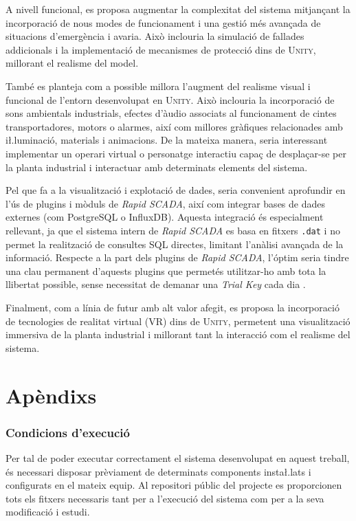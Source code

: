 \documentclass[a4paper,11pt,DIV=13,headings=normal,abstract=true,twoside=semi]{article}
\newcommand{\acro}[1]{\textsc{#1}}
\begin{document}
A nivell funcional, es proposa augmentar la complexitat del sistema mitjançant la incorporació de nous modes de funcionament i una gestió més avançada de situacions d'emergència i avaria. Això inclouria la simulació de fallades addicionals i la implementació de mecanismes de protecció dins de \acro{Unity}, millorant el realisme del model.

També es planteja com a possible millora l'augment del realisme visual i funcional de l'entorn desenvolupat en \acro{Unity}. Això inclouria la incorporació de sons ambientals industrials, efectes d'àudio associats al funcionament de cintes transportadores, motors o alarmes, així com millores gràfiques relacionades amb i\l.luminació, materials i animacions. De la mateixa manera, seria interessant implementar un operari virtual o personatge interactiu capaç de desplaçar-se per la planta industrial i interactuar amb determinats elements del sistema.

Pel que fa a la visualització i explotació de dades, seria convenient aprofundir en l'ús de plugins i mòduls de \emph{Rapid SCADA}, així com integrar bases de dades externes (com PostgreSQL o InfluxDB). Aquesta integració és especialment rellevant, ja que el sistema intern de \emph{Rapid SCADA} es basa en fitxers \texttt{.dat} i no permet la realització de consultes SQL directes, limitant l'anàlisi avançada de la informació. Respecte a la part dels plugins de \emph{Rapid SCADA}, l'óptim seria tindre una clau permanent d'aquests plugins que permetés utilitzar-ho amb tota la llibertat possible, sense necessitat de demanar una \emph{Trial Key} cada dia \cite{store_scada}.

Finalment, com a línia de futur amb alt valor afegit, es proposa la incorporació de tecnologies de realitat virtual (VR) dins de \acro{Unity}, permetent una visualització immersiva de la planta industrial i millorant tant la interacció com el realisme del sistema.
\newpage

\printbibliography[heading=bibintoc]

\newpage
\part{Apèndixs}
\appendix

\section{Condicions d'execució}

Per tal de poder executar correctament el sistema desenvolupat en aquest treball, és necessari disposar prèviament de determinats components insta\l.lats i configurats en el mateix equip. Al repositori públic del projecte es proporcionen tots els fitxers necessaris tant per a l'execució del sistema com per a la seva modificació i estudi.
\end{document}
